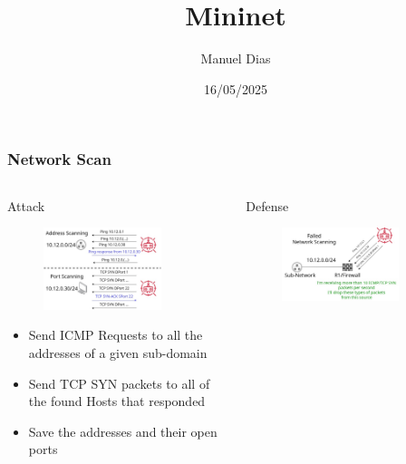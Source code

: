 \documentclass{beamer}
\title{Mininet}
\author{Manuel Dias}
\institute{UCLouvain}
\date{16/05/2025}
\begin{document}
\frame{\titlepage}


\begin{frame}
\frametitle{Network Scan}
\begin{columns}
    \begin{column}{0.5\textwidth}
        \Large Attack
        \begin{figure}
            \centering
            \includegraphics[width=0.8\textwidth]{scan_attack.jpg}\\
        \end{figure}
            \begin{itemize}[label={}]
                \item \footnotesize Send ICMP Requests to all the addresses of a given sub-domain
                \item \footnotesize Send TCP SYN packets to all of the found Hosts that responded
               \item \footnotesize  Save the addresses and their open ports
            \end{itemize}
    \end{column}
    \begin{column}{0.5\textwidth}
        \Large Defense
        \begin{figure}
            \centering
            \includegraphics[width=0.8\textwidth]{scan_defense.jpg}\\

\end{figure}
\end{column}
\end{columns}
\end{frame}
\end{document}
